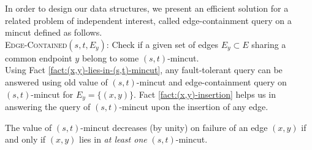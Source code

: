 




In order to design our data structures, we present an efficient solution for a related problem of independent interest, called edge-containment query on a mincut defined as follows.\\

\noindent
{\textsc{Edge-Contained}}$(s,t,E_y)$: Check if a given set of edges $E_y\subset E$ sharing a common endpoint $y$ belong to some $(s,t)$-mincut.\\


Using Fact \ref{fact:(x,y)-lies-in-(s,t)-mincut}, any fault-tolerant query can be answered using old value of $(s,t)$-mincut and edge-containment query on $(s,t)$-mincut for $E_y = \{(x,y)\}$. Fact \ref{fact:(x,y)-insertion} helps us in answering the query of $(s,t)$-mincut upon the insertion of any edge.


 
 \begin{fact}
\label{fact:(x,y)-lies-in-(s,t)-mincut}
The value of $(s,t)$-mincut decreases (by unity) on failure of an edge $(x,y)$ if and only if $(x,y)$ lies in \textit{at least one} $(s,t)$-mincut.
\end{fact}

